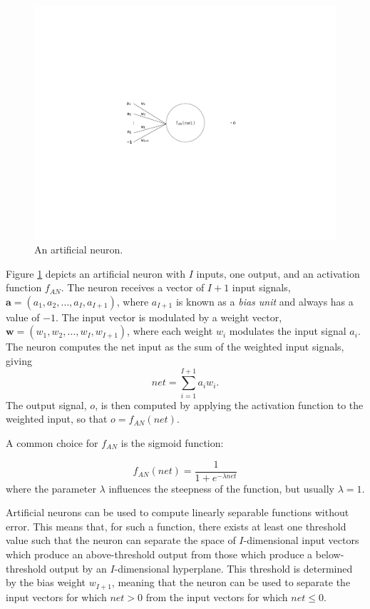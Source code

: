 \documentclass[master]{outhesis}
\begin{document}
\begin{figure}[H]
	\centering
	\includegraphics{ArtificialNeuron.pdf}
	\caption{An artificial neuron.}
	\label{fig:neuron}
\end{figure}

Figure \ref{fig:neuron} depicts an artificial neuron with $I$ inputs, one output, and an activation function $f_{AN}$. The neuron receives a vector of $I+1$ input signals, $\mathbf{a}=(a_1, a_2, \ldots, a_I, a_{I+1})$, where $a_{I+1}$ is known as a \emph{bias unit} and always has a value of $-1$.  The input vector is modulated by a weight vector, $\mathbf{w}=(w_1, w_2, \ldots, w_I, w_{I+1})$, where each weight $w_i$ modulates the input signal $a_i$. The neuron computes the net input as the sum of the weighted input signals, giving
\begin{displaymath}
net=\sum_{i=1}^{I+1}a_iw_i.
\end{displaymath}
The output signal, $o$, is then computed by applying the activation function to the weighted input, so that $o=f_{AN}(net)$.

A common choice for $f_{AN}$ is the sigmoid function:

\begin{displaymath}
f_{AN}(net) = \frac{1}{1 + e^{-\lambda net}}
\end{displaymath}
where the parameter $\lambda$ influences the steepness of the function, but usually $\lambda = 1$.

Artificial neurons can be used to compute linearly separable functions without error. This means that, for such a function, there exists at least one threshold value such that the neuron can separate the space of $I$-dimensional input vectors which produce an above-threshold output from those which produce a below-threshold output by an $I$-dimensional hyperplane. This threshold is determined by the bias weight $w_{I+1}$, meaning that the neuron can be used to separate the input vectors for which $net > 0$ from the input vectors for which $net \le 0$.
\end{document}
